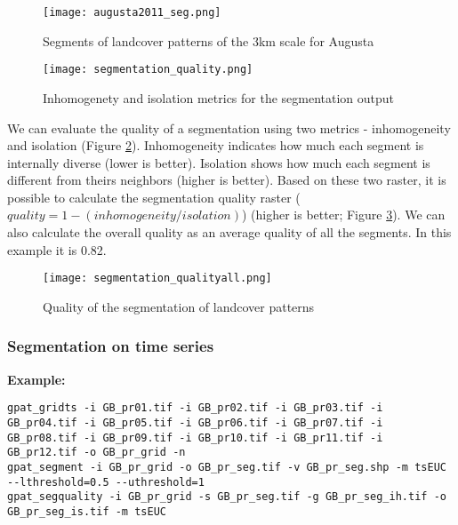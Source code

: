 \begin{figure}[H]
	\centering
	\texttt{[image: augusta2011\_seg.png]}
	\caption{Segments of landcover patterns of the 3km scale for Augusta}
	\label{FIG:SEG1}
\end{figure}

\begin{figure}[H]
	\centering
	\texttt{[image: segmentation\_quality.png]}
	\caption{Inhomogenety and isolation metrics for the segmentation output}
	\label{FIG:SEG2}
\end{figure}

We can evaluate the quality of a segmentation using two metrics - inhomogeneity and isolation (Figure \ref{FIG:SEG2}).
Inhomogeneity indicates how much each segment is internally diverse (lower is better).
Isolation shows how much each segment is different from theirs neighbors (higher is better). 
Based on these two raster, it is possible to calculate the segmentation quality raster ($quality = 1 - (inhomogeneity/isolation)$) (higher is better; Figure \ref{FIG:SEG3}).
We can also calculate the overall quality as an average quality of all the segments.
In this example it is 0.82.

\begin{figure}[H]
	\centering
	\texttt{[image: segmentation\_qualityall.png]}
	\caption{Quality of the segmentation of landcover patterns}
	\label{FIG:SEG3}
\end{figure}

\FloatBarrier

\subsubsection{Segmentation on time series}

{\bf Example:}

\begin{minipage}{\linewidth}
\begin{lstlisting}
gpat_gridts -i GB_pr01.tif -i GB_pr02.tif -i GB_pr03.tif -i GB_pr04.tif -i GB_pr05.tif -i GB_pr06.tif -i GB_pr07.tif -i GB_pr08.tif -i GB_pr09.tif -i GB_pr10.tif -i GB_pr11.tif -i GB_pr12.tif -o GB_pr_grid -n
gpat_segment -i GB_pr_grid -o GB_pr_seg.tif -v GB_pr_seg.shp -m tsEUC --lthreshold=0.5 --uthreshold=1
gpat_segquality -i GB_pr_grid -s GB_pr_seg.tif -g GB_pr_seg_ih.tif -o GB_pr_seg_is.tif -m tsEUC
\end{lstlisting}
\end{minipage}


